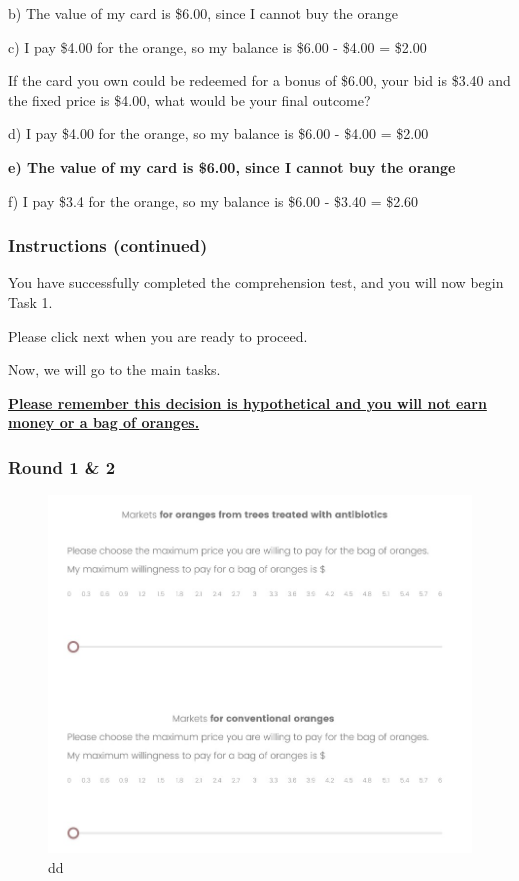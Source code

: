 \documentclass[12pt]{article}
\begin{document}
{b) The value of my card is \$6.00, since I cannot buy the orange  

c) I pay \$4.00 for the orange, so my balance is \$6.00 - \$4.00 = \$2.00  

\vspace{0.5cm}

If the card you own could be redeemed for a bonus of \$6.00, your bid is \$3.40 and the fixed price is \$4.00, what would be your final outcome?  

d) I pay \$4.00 for the orange, so my balance is \$6.00 - \$4.00 = \$2.00  

\textbf{e) The value of my card is \$6.00, since I cannot buy the orange } 

f) I pay \$3.4 for the orange, so my balance is \$6.00 - \$3.40 = \$2.60  

\vspace{0.5cm}

\subsubsection*{\textbf{Instructions (continued)}}

You have successfully completed the comprehension test, and you will now begin Task 1.\par

\vspace{0.5cm}
 Please click next when you are ready to proceed.

Now, we will go to the main tasks. \par
\textbf{\underline{Please remember this decision is hypothetical and you will not earn money or a bag of oranges.}}

\clearpage

\subsubsection*{\centering \textbf{Round 1 \& 2}}

\begin{figure}[H]
    \centering
    \includegraphics[width=0.8\linewidth]{BDM_market.jpg}
    \caption{dd}
    \label{fig:BDM_market}
\end{figure}

}
\end{document}
